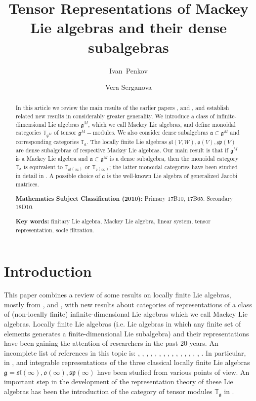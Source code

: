 \documentclass[10pt]{amsart}
\title{Tensor Representations of Mackey Lie algebras and their dense subalgebras}
\author[Ivan Penkov]{\;Ivan~Penkov}
\author[Vera Serganova]{\;Vera Serganova}
\newcommand{\TT}{\mathbb{T}}
\renewcommand{\sp}{\mathfrak{sp}}
\renewcommand{\sl}{\mathfrak{sl}}
\newcommand{\oo}{\mathfrak{o}}
\renewcommand{\aa}{\mathfrak{a}}
\renewcommand{\gg}{\mathfrak{g}}
\begin{document}
\maketitle

\begin{abstract}
 In this article we review the main results of the earlier papers \cite{pstyr}, \cite{ps} and \cite{DPS}, and establish related new results in considerably greater generality. We introduce a class of infinite-dimensional Lie algebras $\gg^{M}$, which we call Mackey Lie algebras, and define monoidal categories $\TT_{\gg^M}$ of tensor $\gg^M-$modules. We also consider dense subalgebras $\aa \subset \gg^M$ and corresponding categories $\TT_\aa$. The locally finite Lie algebras $\sl(V,W), \oo(V), \sp(V)$ are dense subalgebras of respective Mackey Lie algebras. Our main result is that if $\gg^M$ is a Mackey Lie algebra and $\aa \subset \gg^M$ is a dense subalgebra, then the monoidal category $\TT_\aa$ is equivalent to $\TT_{\sl(\infty)}$ or $\TT_{\oo(\infty)}$; the latter monoidal categories have been studied in detail in \cite{DPS}. A possible choice of $\aa$ is the well-known Lie algebra of generalized Jacobi matrices.
 
 \textbf{Mathematics Subject Classification (2010):} Primary 17B10, 17B65. Secondary 18D10.
 
 \textbf{Key words:} finitary Lie algebra, Mackey Lie algebra, linear system, tensor representation, socle filtration.
\end{abstract}


\section*{Introduction}\label{sect:intro}
This paper combines a review of some results on locally finite Lie
algebras, mostly from \cite{pstyr}, \cite{ps} and \cite{DPS}, with new
results about categories of representations of a class of (non-locally
finite) infinite-dimensional Lie algebras which we call Mackey Lie
algebras. Locally finite Lie algebras (i.e. Lie algebras in which any
finite set of elements generates a finite-dimensional Lie subalgebra)
and their representations have been gaining the attention of
researchers in the past 20 years. An incomplete list of references in this topic is: \cite{BA1}, \cite{BB}, \cite{BS}, \cite{dip}, \cite{dip3}, \cite{DPS}, \cite{DPSn}, \cite{DPW}, \cite{DaPW} \cite{N}, \cite{Na}, \cite{NP}, \cite{NS}, \cite{O}, \cite{ps}, \cite{pstyr}, \cite{PZ}. In particular, in \cite{pstyr}, \cite{ps} and \cite{DPS} integrable representations of the three
classical locally finite Lie algebras 
$\gg = \sl(\infty), \oo(\infty), \sp(\infty)$ 
have been studied from various points of view. An important step in
the development of the representation theory of 
these Lie algebras has been the introduction of the category of tensor modules $\TT_\gg$ in \cite{DPS}.
\end{document}
